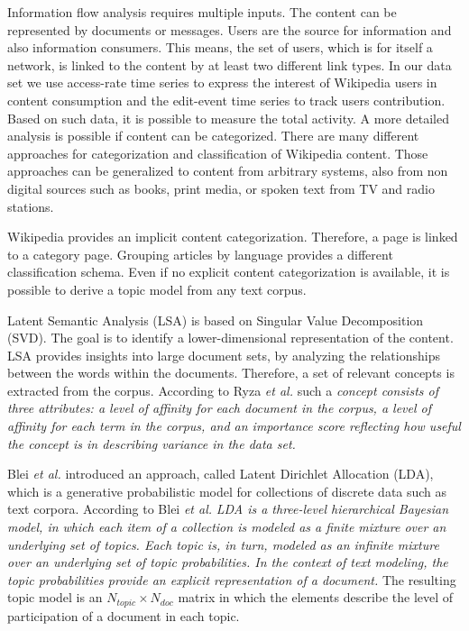 \documentclass[a4paper,10pt]{scrbook}
\begin{document}
Information flow analysis requires multiple inputs. The content can be represented by documents or messages. Users are the source for information and also information consumers. This means, the set of users, which is for itself a network, is linked to the content by at least two different link types. In our data set we use access-rate time series to express the interest of Wikipedia users in content consumption and the edit-event time series to track users contribution. Based on such data, it is possible to measure the total activity. A more detailed analysis is possible if content can be categorized. There are many different approaches for categorization and classification of Wikipedia content. Those approaches can be generalized to content from arbitrary systems, also from non digital sources such as books, print media, or spoken text from TV and radio stations.  

Wikipedia provides an implicit content categorization. Therefore, a page is linked to a category page. Grouping articles by language provides a different classification schema. Even if no explicit content categorization is available, it is possible to derive a topic model from any text corpus. 

Latent Semantic Analysis (LSA) is based on Singular Value Decomposition (SVD). The goal is to identify a lower-dimensional representation of the content. LSA provides insights into large document sets, by analyzing the relationships
between the words within the documents. Therefore, a set of relevant concepts is extracted from the corpus. According to Ryza \textit{et al.} \cite{Ryza2015} such a \textit{concept consists of three attributes: a level of affinity for each document
in the corpus, a level of affinity for each term in the corpus, and an importance
score reflecting how useful the concept is in describing variance in the data set.}

Blei \textit{et al.} \cite{Blei2003} introduced an approach, called Latent Dirichlet Allocation (LDA), which is a generative probabilistic model for collections of discrete data such as text corpora. According to Blei \textit{et al.} \textit{LDA is a three-level hierarchical Bayesian model, in which each item of a collection is modeled as a finite mixture over an underlying set of topics. Each topic is, in turn, modeled as an infinite mixture over an underlying set of topic probabilities. In the context of text modeling, the topic probabilities provide an explicit representation of a document.} The resulting topic model is an $N_{topic} \times N_{doc}$ matrix in which the elements describe the level of participation of a document in each topic.
\end{document}
